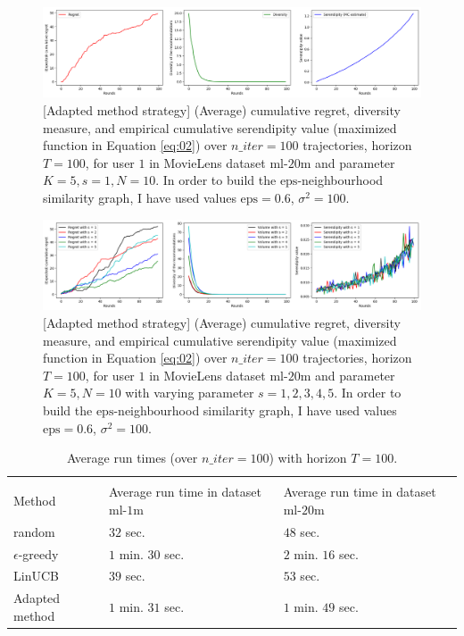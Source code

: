 \documentclass{article}
\begin{document}
\begin{figure}[H]
  \centering
  \includegraphics[scale=0.4]{../Results/ml-20m/lagree-1min49sec.png}
  \caption{[Adapted method strategy] (Average) cumulative regret, diversity measure, and empirical cumulative serendipity value (maximized function in Equation \ref{eq:02}) over $n\_iter=100$ trajectories, horizon $T=100$, for user $1$ in MovieLens dataset $\text{ml-20m}$ and parameter $K=5, s=1, N=10$. In order to build the $\text{eps}$-neighbourhood similarity graph, I have used values $\text{eps}=0.6$, $\sigma^{2}=100$.}
\label{figlagree}
\end{figure}

\begin{figure}[H]
  \centering
  \includegraphics[scale=0.4]{../Results/ml-20m/lagree.png}
  \caption{[Adapted method strategy] (Average) cumulative regret, diversity measure, and empirical cumulative serendipity value (maximized function in Equation \ref{eq:02}) over $n\_iter=100$ trajectories, horizon $T=100$, for user $1$ in MovieLens dataset $\text{ml-20m}$ and parameter $K=5, N=10$ with varying parameter $s=1, 2, 3, 4, 5$. In order to build the $\text{eps}$-neighbourhood similarity graph, I have used values $\text{eps}=0.6$, $\sigma^{2}=100$.}
\label{figlagreecomp}
\end{figure}

\begin{table}[H]
  \label{runtimes}
  \centering
  \begin{tabular}{lll}
    \multicolumn{3}{c}{}                   \\
    \cmidrule(r){1-3}
    Method     & Average run time in dataset $\text{ml-1m}$ &  Average run time in dataset $\text{ml-20m}$  \\
    \midrule
    random & $32$ sec. & $48$ sec.  \\
    $\epsilon$-greedy & $1$ min. $30$ sec. & $2$ min. $16$ sec.\\
    LinUCB     & $39$ sec. & $53$ sec.\\
    Adapted method     & $1$ min. $31$ sec. & $1$ min. $49$ sec. \\
    \bottomrule
  \end{tabular}
  \caption{Average run times (over $n\_iter=100$) with horizon $T=100$.}
\end{table}
\end{document}
